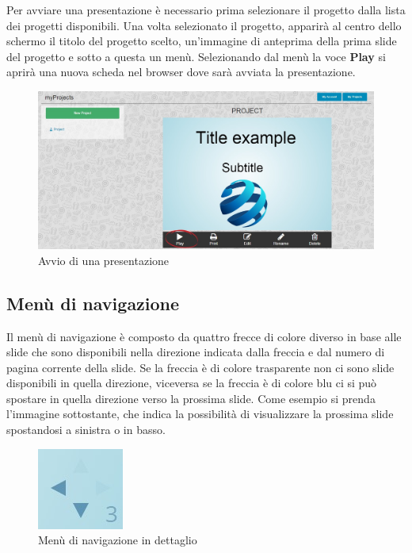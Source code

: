Per avviare una presentazione è necessario prima selezionare il progetto dalla lista dei progetti disponibili. Una volta selezionato il progetto, apparirà al centro dello schermo il titolo del progetto scelto, un'immagine di anteprima della prima slide del progetto e sotto a questa un menù. Selezionando dal menù la voce \textbf{Play} si aprirà una nuova scheda nel browser dove sarà avviata la presentazione.

\begin{figure}[H] 
	\centering 
	\includegraphics[scale=0.40] {img/avv_pres}
	\caption{Avvio di una presentazione} 
\end{figure}

\subsection{Menù di navigazione}
\noindent Il menù di navigazione è composto da quattro frecce di colore diverso in base alle slide che sono disponibili nella direzione indicata dalla freccia e dal numero di pagina corrente della slide. Se la freccia è di colore trasparente non ci sono slide disponibili in quella direzione, viceversa se la freccia è di colore blu ci si può spostare in quella direzione verso la prossima slide. Come esempio si prenda l'immagine sottostante, che indica la possibilità di visualizzare la prossima slide spostandosi a sinistra o in basso.

\begin{figure}[H] 
	\centering 
	\includegraphics[scale=0.70] {img/nav}
	\caption{Menù di navigazione in dettaglio} 
	\end{figure}

